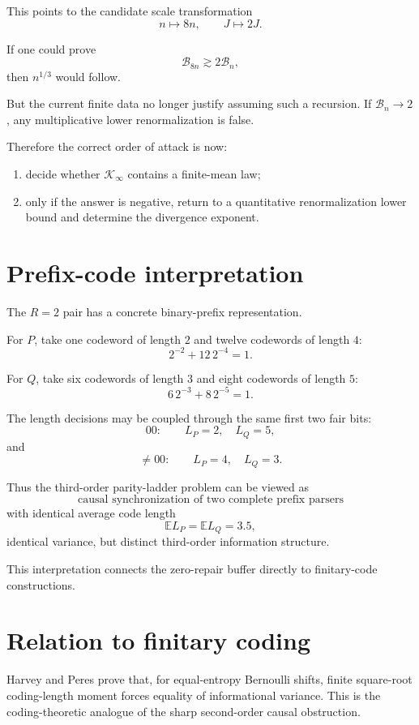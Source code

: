 \documentclass[11pt,a4paper]{article}
\newcommand{\E}{\mathbb E}
\newcommand{\cB}{\mathcal B}
\newcommand{\cK}{\mathcal K}
\begin{document}
This points to the candidate scale transformation
\[
n\mapsto8n,
\qquad
J\mapsto2J.
\]

If one could prove
\[
\cB_{8n}\gtrsim2\cB_n,
\]
then \(n^{1/3}\) would follow.

But the current finite data no longer justify assuming such a recursion.
If \(\cB_n\to2\), any multiplicative lower renormalization is false.

Therefore the correct order of attack is now:

\begin{enumerate}[label=\arabic*.]
\item decide whether \(\cK_\infty\) contains a finite-mean law;
\item only if the answer is negative, return to a quantitative
renormalization lower bound and determine the divergence exponent.
\end{enumerate}

\section{Prefix-code interpretation}

The \(R=2\) pair has a concrete binary-prefix representation.

For \(P\), take one codeword of length \(2\) and twelve codewords of length
\(4\):
\[
2^{-2}+12\,2^{-4}=1.
\]

For \(Q\), take six codewords of length \(3\) and eight codewords of length
\(5\):
\[
6\,2^{-3}+8\,2^{-5}=1.
\]

The length decisions may be coupled through the same first two fair bits:
\[
00:
\qquad
L_P=2,\quad L_Q=5,
\]
and
\[
\neq00:
\qquad
L_P=4,\quad L_Q=3.
\]

Thus the third-order parity-ladder problem can be viewed as
\[
\boxed{
\text{causal synchronization of two complete prefix parsers}
}
\]
with identical average code length
\[
\E L_P=\E L_Q=3.5,
\]
identical variance, but distinct third-order information structure.

This interpretation connects the zero-repair buffer directly to
finitary-code constructions.

\section{Relation to finitary coding}

Harvey and Peres prove that, for equal-entropy Bernoulli shifts, finite
square-root coding-length moment forces equality of informational variance.
This is the coding-theoretic analogue of the sharp second-order causal
obstruction.
\end{document}
